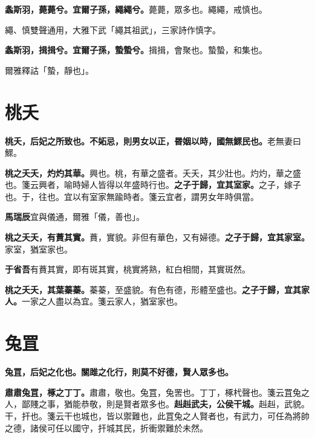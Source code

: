 \textbf{螽斯羽，薨薨兮。宜爾子孫，繩繩兮。}{\footnotesize 薨薨，眾多也。繩繩，戒慎也。}

\begin{quoting}繩、慎雙聲通用，大雅下武「繩其祖武」，三家詩作慎字。\end{quoting}

\textbf{螽斯羽，揖揖兮。宜爾子孫，蟄蟄兮。}{\footnotesize 揖揖，會聚也。蟄蟄，和集也。}

\begin{quoting}爾雅釋詁「蟄，靜也」。\end{quoting}

\section{桃夭}


\textbf{桃夭，后妃之所致也。不妬忌，則男女以正，昬姻以時，國無鰥民也。}{\footnotesize 老無妻曰鰥。}

\textbf{桃之夭夭，灼灼其華。}{\footnotesize 興也。桃，有華之盛者。夭夭，其少壯也。灼灼，華之盛也。箋云興者，喻時婦人皆得以年盛時行也。}\textbf{之子于歸，宜其室家。}{\footnotesize 之子，嫁子也。于，往也。宜以有室家無踰時者。箋云宜者，謂男女年時俱當。}

\begin{quoting}\textbf{馬瑞辰}宜與儀通，爾雅「儀，善也」。\end{quoting}

\textbf{桃之夭夭，有蕡其實。}{\footnotesize 蕡，實貌。非但有華色，又有婦德。}\textbf{之子于歸，宜其家室。}{\footnotesize 家室，猶室家也。}

\begin{quoting}\textbf{于省吾}有蕡其實，即有斑其實，桃實將熟，紅白相間，其實斑然。\end{quoting}

\textbf{桃之夭夭，其葉蓁蓁。}{\footnotesize 蓁蓁，至盛貌。有色有德，形體至盛也。}\textbf{之子于歸，宜其家人。}{\footnotesize 一家之人盡以為宜。箋云家人，猶室家也。}

\section{兔罝}


\textbf{兔罝，后妃之化也。關雎之化行，則莫不好德，賢人眾多也。}

\textbf{肅肅兔罝，椓之丁丁。}{\footnotesize 肅肅，敬也。兔罝，兔罟也。丁丁，椓杙聲也。箋云罝兔之人，鄙賤之事，猶能恭敬，則是賢者眾多也。}\textbf{赳赳武夫，公侯干城。}{\footnotesize 赳赳，武貌。干，扞也。箋云干也城也，皆以禦難也，此罝兔之人賢者也，有武力，可任為將帥之德，諸侯可任以國守，扞城其民，折衝禦難於未然。}

